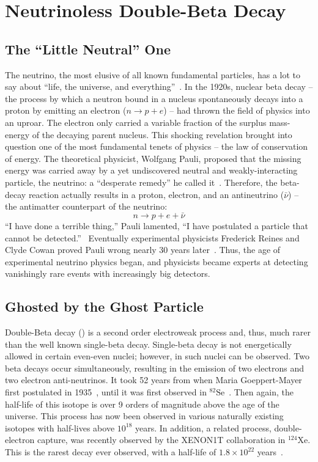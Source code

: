 \chapter{Neutrinoless Double-Beta Decay} \label{chap:theory} 
\section{The ``Little Neutral'' One}
The neutrino, the most elusive of all known fundamental particles, has a lot to say about ``life, the universe, and everything''~\cite{42}. In the 1920s, nuclear beta decay -- the process by which a neutron bound in a nucleus spontaneously decays into a proton by emitting an electron ($n\rightarrow p + e$) -- had thrown the field of physics into an uproar. The electron only carried a variable fraction of the surplus mass-energy of the decaying parent nucleus. This shocking revelation brought into question one of the most fundamental tenets of physics -- the law of conservation of energy. The theoretical physicist, Wolfgang Pauli, proposed that the missing energy was carried away by a yet undiscovered neutral and weakly-interacting particle, the neutrino: a ``desperate remedy'' he called it~\cite{pauli_letter}. Therefore, the beta-decay reaction actually results in a proton, electron, and an antineutrino ($\bar{\nu}$) -- the antimatter counterpart of the neutrino: $$n\rightarrow p + e + \bar{\nu}$$ ``I have done a terrible thing,'' Pauli lamented, ``I have postulated a particle that cannot be detected.''~\cite{pauli_quote} Eventually experimental physicists Frederick Reines and Clyde Cowan proved Pauli wrong nearly 30 years later~\cite{neutrino_discovery}. Thus, the age of experimental neutrino physics began, and physicists became experts at detecting vanishingly rare events with increasingly big detectors. 

\section{Ghosted by the Ghost Particle}
Double-Beta decay (\twovbb{}) is a second order electroweak process and, thus, much rarer than the well known single-beta decay. Single-beta decay is not energetically allowed in certain even-even nuclei; however, in such nuclei \twovbb{} can be observed. Two beta decays occur simultaneously, resulting in the emission of two electrons and two electron anti-neutrinos. It took 52 years from when Maria Goeppert-Mayer first postulated \twovbb{} in 1935~\cite{2vbb}, until it was first observed in $^{82}\text{Se}$~\cite{2vbb_obs}. Then again, the half-life of this isotope is over 9 orders of magnitude above the age of the universe.  This process has now been observed in various naturally existing isotopes with half-lives above $10^{18}$ years. In addition, a related process, double-electron capture, was recently observed by the XENON1T collaboration in $^{124}\text{Xe}$. This is the rarest decay ever observed, with a half-life of $1.8\times10^{22}$ years~\cite{ee_cap}.

